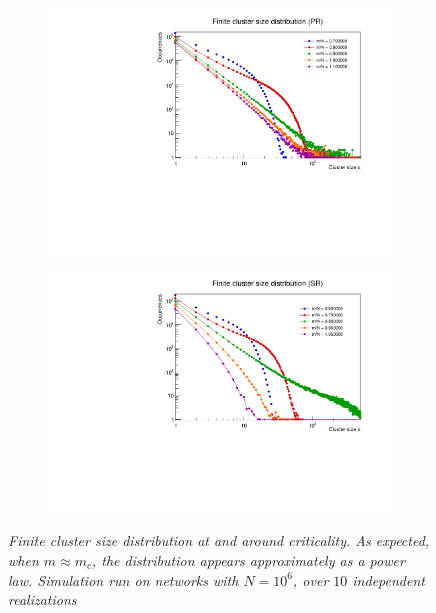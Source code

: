 \begin{figure}
	\vspace{0.5em} %
	
	\begin{subfigure}[b]{0.45\linewidth}
		\includegraphics[width=\linewidth]{images/ClusterDistrPR.pdf}
	\end{subfigure}
	\hspace{0.5em}
	\begin{subfigure}[b]{0.45\linewidth}
		\includegraphics[width=\linewidth]{images/ClusterDistrSR.pdf}
	\end{subfigure}
	\caption{\textit{Finite cluster size distribution at and around criticality. As expected, when $m \approx m_c$, the distribution appears approximately as a power law. Simulation run on networks with $N = 10^6$, over $10$ independent realizations}}
	\label{fig:ClusterDistr}
\end{figure}

\newpage